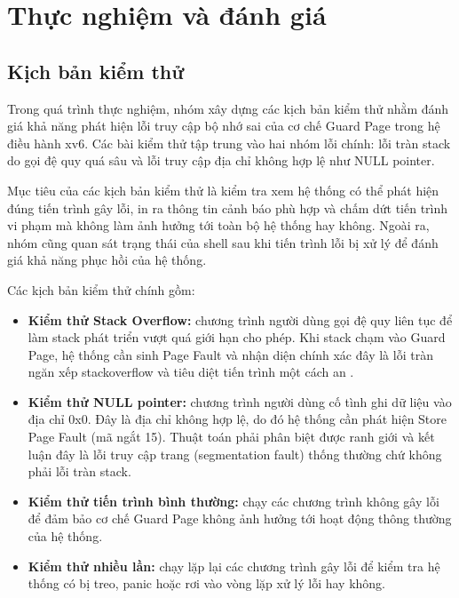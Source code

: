 \chapter{Thực nghiệm và đánh giá }

\section{Kịch bản kiểm thử}
Trong quá trình thực nghiệm, nhóm xây dựng các kịch bản kiểm thử nhằm đánh giá khả năng phát hiện lỗi truy cập bộ nhớ sai của cơ chế Guard Page trong hệ điều hành xv6. Các bài kiểm thử tập trung vào hai nhóm lỗi chính: lỗi tràn stack do gọi đệ quy quá sâu và lỗi truy cập địa chỉ không hợp lệ như NULL pointer.

Mục tiêu của các kịch bản kiểm thử là kiểm tra xem hệ thống có thể phát hiện đúng tiến trình gây lỗi, in ra thông tin cảnh báo phù hợp và chấm dứt tiến trình vi phạm mà không làm ảnh hưởng tới toàn bộ hệ thống hay không. Ngoài ra, nhóm cũng quan sát trạng thái của shell sau khi tiến trình lỗi bị xử lý để đánh giá khả năng phục hồi của hệ thống.

Các kịch bản kiểm thử chính gồm:

\begin{itemize}
    \item \textbf{Kiểm thử Stack Overflow:} chương trình người dùng gọi đệ quy liên tục để làm stack phát triển vượt quá giới hạn cho phép. Khi stack chạm vào Guard Page, hệ thống cần sinh Page Fault và nhận diện chính xác đây là lỗi tràn ngăn xếp stackoverflow và tiêu diệt tiến trình một cách an .
    
    \item \textbf{Kiểm thử NULL pointer:} chương trình người dùng cố tình ghi dữ liệu vào địa chỉ 0x0. Đây là địa chỉ không hợp lệ, do đó hệ thống cần phát hiện Store Page Fault (mã ngắt 15). Thuật toán phải phân biệt được ranh giới và kết luận đây là lỗi truy cập trang (segmentation fault) thống thường chứ không phải lỗi tràn stack.
    
    \item \textbf{Kiểm thử tiến trình bình thường:} chạy các chương trình không gây lỗi để đảm bảo cơ chế Guard Page không ảnh hưởng tới hoạt động thông thường của hệ thống.
    
    \item \textbf{Kiểm thử nhiều lần:} chạy lặp lại các chương trình gây lỗi để kiểm tra hệ thống có bị treo, panic hoặc rơi vào vòng lặp xử lý lỗi hay không.
\end{itemize}

